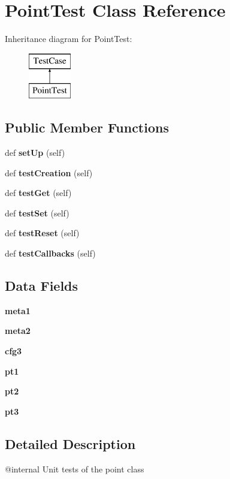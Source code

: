 \section{Point\+Test Class Reference}
\label{classpoint_1_1_point_test}
Inheritance diagram for Point\+Test\+:\begin{figure}[H]
\begin{center}
\leavevmode
\includegraphics[height=2.000000cm]{classpoint_1_1_point_test}
\end{center}
\end{figure}
\subsection*{Public Member Functions}
\begin{DoxyCompactItemize}
\item 
def {\bf set\+Up} (self)
\item 
def {\bf test\+Creation} (self)
\item 
def {\bf test\+Get} (self)
\item 
def {\bf test\+Set} (self)
\item 
def {\bf test\+Reset} (self)
\item 
def {\bf test\+Callbacks} (self)
\end{DoxyCompactItemize}
\subsection*{Data Fields}
\begin{DoxyCompactItemize}
\item 
{\bf meta1}
\item 
{\bf meta2}
\item 
{\bf cfg3}
\item 
{\bf pt1}
\item 
{\bf pt2}
\item 
{\bf pt3}
\end{DoxyCompactItemize}


\subsection{Detailed Description}
\begin{DoxyVerb}@internal
    Unit tests of the point class\end{DoxyVerb}
 

